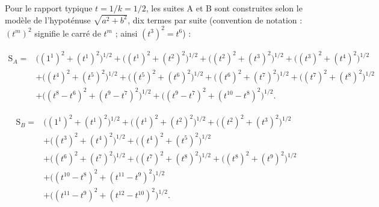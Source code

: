 \documentclass[11pt,a4paper]{article}
\newcommand{\SA}{\mathrm{S}_A}
\newcommand{\SB}{\mathrm{S}_B}
\begin{document}
Pour le rapport typique $t = 1/k = 1/2$, les suites A et B sont construites
selon le modèle de l'hypoténuse $\sqrt{a^{2}+b^{2}}$, dix termes par suite
(convention de notation : $(t^{m})^{2}$ signifie le carré de $t^{m}$ ; ainsi
$(t^{3})^{2} = t^{6}$) :

\vspace{0.3cm}
\begin{boiteformule}
\[
\begin{aligned}
\SA ={}& \bigl((1^{1})^{2} + (t^{1})^{2}\bigr)^{1/2}
 + \bigl((t^{1})^{2} + (t^{2})^{2}\bigr)^{1/2}
 + \bigl((t^{2})^{2} + (t^{3})^{2}\bigr)^{1/2}
 + \bigl((t^{3})^{2} + (t^{4})^{2}\bigr)^{1/2} \\
& + \bigl((t^{4})^{2} + (t^{5})^{2}\bigr)^{1/2}
 + \bigl((t^{5})^{2} + (t^{6})^{2}\bigr)^{1/2}
 + \bigl((t^{6})^{2} + (t^{7})^{2}\bigr)^{1/2}
 + \bigl((t^{7})^{2} + (t^{8})^{2}\bigr)^{1/2} \\
& + \bigl((t^{8} - t^{6})^{2} + (t^{9} - t^{7})^{2}\bigr)^{1/2}
 + \bigl((t^{9} - t^{7})^{2} + (t^{10} - t^{8})^{2}\bigr)^{1/2}.
\end{aligned}
\]
\end{boiteformule}

\vspace{0.3cm}
\begin{boiteformule}
\[
\begin{aligned}
\SB ={}& \bigl((1^{1})^{2} + (t^{1})^{2}\bigr)^{1/2}
 + \bigl((t^{1})^{2} + (t^{2})^{2}\bigr)^{1/2}
 + \bigl((t^{2})^{2} + (t^{3})^{2}\bigr)^{1/2} \\
& + \bigl((t^{3})^{2} + (t^{4})^{2}\bigr)^{1/2}
 + \bigl((t^{4})^{2} + (t^{5})^{2}\bigr)^{1/2} \\
& + \bigl((t^{6})^{2} + (t^{7})^{2}\bigr)^{1/2}
 + \bigl((t^{7})^{2} + (t^{8})^{2}\bigr)^{1/2}
 + \bigl((t^{8})^{2} + (t^{9})^{2}\bigr)^{1/2} \\
& + \bigl((t^{10} - t^{8})^{2} + (t^{11} - t^{9})^{2}\bigr)^{1/2} \\
& + \bigl((t^{11} - t^{9})^{2} + (t^{12} - t^{10})^{2}\bigr)^{1/2}.
\end{aligned}
\]
\end{boiteformule}
\end{document}
